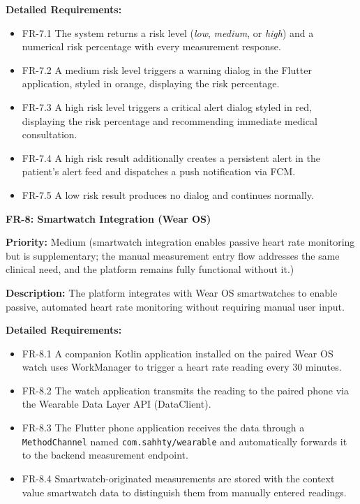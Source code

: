 \textbf{Detailed Requirements:}
\begin{itemize}
    \item FR-7.1 \; The system returns a risk level (\textit{low}, \textit{medium}, or
    \textit{high}) and a numerical risk percentage with every measurement response.
    \item FR-7.2 \; A medium risk level triggers a warning dialog in the
    Flutter application, styled in orange, displaying the risk percentage.
    \item FR-7.3 \; A high risk level triggers a critical alert dialog styled in
    red, displaying the risk percentage and recommending immediate medical consultation.
    \item FR-7.4 \; A high risk result additionally creates a persistent alert in
    the patient's alert feed and dispatches a push notification via FCM.
    \item FR-7.5 \; A low risk result produces no dialog and continues normally.
\end{itemize}

\medskip

\textbf{FR-8: Smartwatch Integration (Wear OS)}

\textbf{Priority:} Medium (smartwatch integration enables passive heart rate monitoring but is supplementary; the manual measurement entry flow addresses the same clinical need, and the platform remains fully functional without it.)

\textbf{Description:} The platform integrates with Wear OS smartwatches to enable
passive, automated heart rate monitoring without requiring manual user input.

\textbf{Detailed Requirements:}
\begin{itemize}
    \item FR-8.1 \; A companion Kotlin application installed on the paired Wear OS watch
    uses WorkManager to trigger a heart rate reading every 30 minutes.
    \item FR-8.2 \; The watch application transmits the reading to the paired phone
    via the Wearable Data Layer API (DataClient).
    \item FR-8.3 \; The Flutter phone application receives the data through a
    \texttt{MethodChannel} named \texttt{com.sahhty/wearable} and automatically
    forwards it to the backend measurement endpoint.
    \item FR-8.4 \; Smartwatch-originated measurements are stored with the context
    value smartwatch data to distinguish them from manually entered readings.
\end{itemize}

